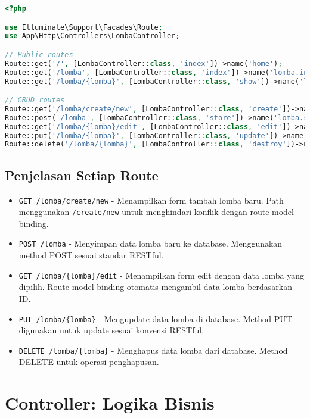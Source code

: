 \documentclass[12pt,a4paper]{article}
\begin{document}
\begin{lstlisting}[language=PHP]
<?php

use Illuminate\Support\Facades\Route;
use App\Http\Controllers\LombaController;

// Public routes
Route::get('/', [LombaController::class, 'index'])->name('home');
Route::get('/lomba', [LombaController::class, 'index'])->name('lomba.index');
Route::get('/lomba/{lomba}', [LombaController::class, 'show'])->name('lomba.show');

// CRUD routes
Route::get('/lomba/create/new', [LombaController::class, 'create'])->name('lomba.create');
Route::post('/lomba', [LombaController::class, 'store'])->name('lomba.store');
Route::get('/lomba/{lomba}/edit', [LombaController::class, 'edit'])->name('lomba.edit');
Route::put('/lomba/{lomba}', [LombaController::class, 'update'])->name('lomba.update');
Route::delete('/lomba/{lomba}', [LombaController::class, 'destroy'])->name('lomba.destroy');
\end{lstlisting}

\subsection{Penjelasan Setiap Route}

\begin{itemize}
    \item \texttt{GET /lomba/create/new} - Menampilkan form tambah lomba baru. Path menggunakan \texttt{/create/new} untuk menghindari konflik dengan route model binding.
    
    \item \texttt{POST /lomba} - Menyimpan data lomba baru ke database. Menggunakan method POST sesuai standar RESTful.
    
    \item \texttt{GET /lomba/\{lomba\}/edit} - Menampilkan form edit dengan data lomba yang dipilih. Route model binding otomatis mengambil data lomba berdasarkan ID.
    
    \item \texttt{PUT /lomba/\{lomba\}} - Mengupdate data lomba di database. Method PUT digunakan untuk update sesuai konvensi RESTful.
    
    \item \texttt{DELETE /lomba/\{lomba\}} - Menghapus data lomba dari database. Method DELETE untuk operasi penghapusan.
\end{itemize}

\section{Controller: Logika Bisnis}
\end{document}
